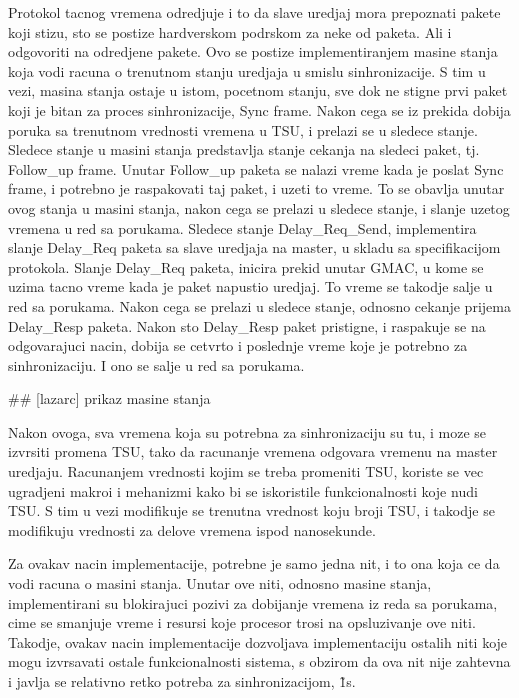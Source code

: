 \documentclass[a4paper,12pt, master]{etf}
\begin{document}
    Protokol tacnog vremena odredjuje i to da slave uredjaj mora prepoznati pakete koji stizu, sto se postize
    hardverskom podrskom za neke od paketa. Ali i odgovoriti na odredjene pakete. Ovo se postize
    implementiranjem masine stanja koja vodi racuna o trenutnom stanju uredjaja u smislu sinhronizacije. S
    tim u vezi, masina stanja ostaje u istom, pocetnom stanju, sve dok ne stigne prvi paket koji je bitan za
    proces sinhronizacije, Sync frame. Nakon cega se iz prekida dobija poruka sa trenutnom vrednosti vremena
    u TSU, i prelazi se u sledece stanje. Sledece stanje u masini stanja predstavlja stanje cekanja na
    sledeci paket, tj. Follow\_up frame. Unutar Follow\_up paketa se nalazi vreme kada je poslat Sync frame,
    i potrebno je raspakovati taj paket, i uzeti to vreme. To se obavlja unutar ovog stanja u masini stanja,
    nakon cega se prelazi u sledece stanje, i slanje uzetog vremena u red sa porukama. Sledece stanje
    Delay\_Req\_Send, implementira slanje Delay\_Req paketa sa slave uredjaja na master, u skladu sa
    specifikacijom protokola. Slanje Delay\_Req paketa, inicira prekid unutar GMAC, u kome se uzima tacno
    vreme kada je paket napustio uredjaj. To vreme se takodje salje u red sa porukama. Nakon cega se prelazi
    u sledece stanje, odnosno cekanje prijema Delay\_Resp paketa. Nakon sto Delay\_Resp paket pristigne, i
    raspakuje se na odgovarajuci nacin, dobija se cetvrto i poslednje vreme koje je potrebno za
    sinhronizaciju. I ono se salje u red sa porukama.

    \#\# [lazarc] prikaz masine stanja

    Nakon ovoga, sva vremena koja su potrebna za sinhronizaciju su tu, i moze se izvrsiti promena TSU, tako
    da racunanje vremena odgovara vremenu na master uredjaju. Racunanjem vrednosti kojim se treba promeniti
    TSU, koriste se vec ugradjeni makroi i mehanizmi kako bi se iskoristile funkcionalnosti koje nudi TSU\@. S
    tim u vezi modifikuje se trenutna vrednost koju broji TSU, i takodje se modifikuju vrednosti za delove
    vremena ispod nanosekunde.

    Za ovakav nacin implementacije, potrebne je samo jedna nit, i to ona koja ce da vodi racuna o masini
    stanja. Unutar ove niti, odnosno masine stanja, implementirani su blokirajuci pozivi za dobijanje vremena
    iz reda sa porukama, cime se smanjuje vreme i resursi koje procesor trosi na opsluzivanje ove niti.
    Takodje, ovakav nacin implementacije dozvoljava implementaciju ostalih niti koje mogu izvrsavati ostale
    funkcionalnosti sistema, s obzirom da ova nit nije zahtevna i javlja se relativno retko potreba za
    sinhronizacijom, \~1s.
\end{document}
